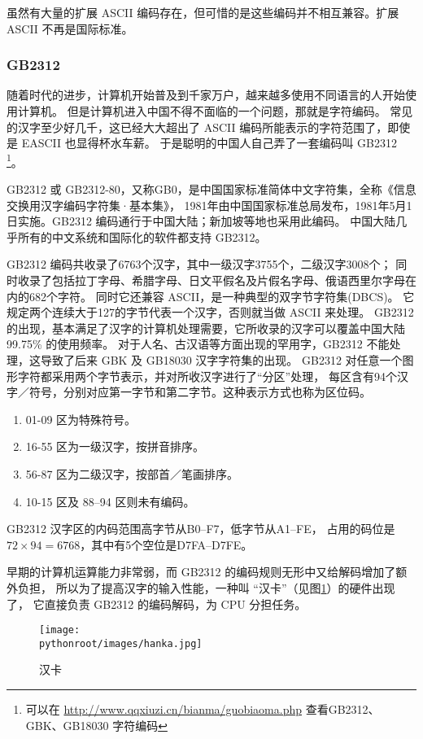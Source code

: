 虽然有大量的扩展 ASCII 编码存在，但可惜的是这些编码并不相互兼容。扩展 ASCII 不再是国际标准。

\subsubsection{GB2312}
随着时代的进步，计算机开始普及到千家万户，越来越多使用不同语言的人开始使用计算机。
但是计算机进入中国不得不面临的一个问题，那就是字符编码。
常见的汉字至少好几千，这已经大大超出了 ASCII 编码所能表示的字符范围了，即使是 EASCII 也显得杯水车薪。
于是聪明的中国人自己弄了一套编码叫 GB2312
\footnote{可以在 \url{http://www.qqxiuzi.cn/bianma/guobiaoma.php} 查看GB2312、GBK、GB18030 字符编码}。

GB2312 或 GB2312-80，又称GB0，是中国国家标准简体中文字符集，全称《信息交换用汉字编码字符集·基本集》，
1981年由中国国家标准总局发布，1981年5月1日实施。GB2312 编码通行于中国大陆；新加坡等地也采用此编码。
中国大陆几乎所有的中文系统和国际化的软件都支持 GB2312。

GB2312 编码共收录了6763个汉字，其中一级汉字3755个，二级汉字3008个；
同时收录了包括拉丁字母、希腊字母、日文平假名及片假名字母、俄语西里尔字母在内的682个字符。
同时它还兼容 ASCII，是一种典型的双字节字符集(DBCS)。
它规定两个连续大于127的字节代表一个汉字，否则就当做 ASCII 来处理。
GB2312 的出现，基本满足了汉字的计算机处理需要，它所收录的汉字可以覆盖中国大陆99.75\% 的使用频率。
对于人名、古汉语等方面出现的罕用字，GB2312 不能处理，这导致了后来 GBK 及 GB18030 汉字字符集的出现。
GB2312 对任意一个图形字符都采用两个字节表示，并对所收汉字进行了“分区”处理，
每区含有94个汉字／符号，分别对应第一字节和第二字节。这种表示方式也称为区位码。
\begin{enumerate}
  \item 01-09 区为特殊符号。
  \item 16-55 区为一级汉字，按拼音排序。
  \item 56-87 区为二级汉字，按部首／笔画排序。
  \item 10-15 区及 88--94 区则未有编码。
\end{enumerate}

GB2312 汉字区的内码范围高字节从B0--F7，低字节从A1--FE，
占用的码位是 $72 \times 94 = 6768$，其中有5个空位是D7FA--D7FE。

早期的计算机运算能力非常弱，而 GB2312 的编码规则无形中又给解码增加了额外负担， 
所以为了提高汉字的输入性能，一种叫 “汉卡”（见图\ref{fig:hanka}）的硬件出现了，
它直接负责 GB2312 的编码解码，为 CPU 分担任务。
\begin{figure}[ht]
  \centering
  \texttt{[image: \\pythonroot/images/hanka.jpg]}
  \caption{汉卡}
  \label{fig:hanka}
\end{figure}


